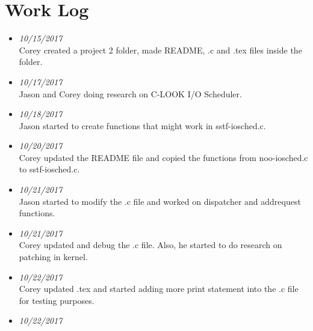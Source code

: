 \documentclass[onecolumn, draftclsnofoot,10pt, compsoc]{IEEEtran}
\begin{document}
\section{Work Log}
\begin{itemize}

\item \textit{10/15/2017}\\ Corey created a project 2 folder, made README, .c and .tex files inside the folder. \\
\item \textit{10/17/2017}\\ Jason and Corey doing research on C-LOOK I/O Scheduler. \\
\item \textit{10/18/2017}\\ Jason started to create functions that might work in sstf-iosched.c. \\ 
\item \textit{10/20/2017}\\ Corey updated the README file and copied the functions from noo-iosched.c to sstf-iosched.c. \\
\item \textit{10/21/2017}\\ Jason started to modify the .c file and worked on dispatcher and addrequest functions. \\
\item \textit{10/21/2017}\\ Corey updated and debug the .c file. Also, he started to do research on patching in kernel. \\ 
\item \textit{10/22/2017}\\ Corey updated .tex and started adding more print statement into the .c file for testing purposes. \\
\item \textit{10/22/2017}\\
\end{itemize}
\end{document}
